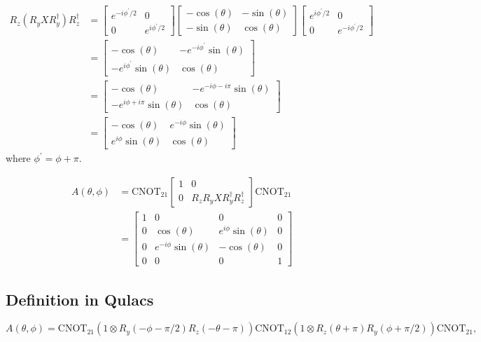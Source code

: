 \documentclass[11pt, oneside]{article}   	%
\begin{document}
\begin{align}
R_z (R_y X R^{\dagger}_y) R^{\dagger}_z
&= 
\begin{bmatrix}
e^{-i \phi^{\prime}/2} & 0 \\
0 & e^{i \phi^{\prime}/2}
\end{bmatrix}
\begin{bmatrix}
- \cos(\theta) & -\sin(\theta) \\
-\sin(\theta) & \cos(\theta)
\end{bmatrix}
\begin{bmatrix}
e^{i \phi^{\prime}/2} & 0 \\
0 & e^{-i \phi^{\prime}/2}
\end{bmatrix} \\
&=
\begin{bmatrix}
- \cos(\theta) & -e^{-i \phi^{\prime}} \sin(\theta) \\
-e^{i \phi^{\prime}} \sin(\theta) & \cos(\theta)
\end{bmatrix} \\
&=
\begin{bmatrix}
- \cos(\theta) & -e^{-i \phi - i \pi} \sin(\theta) \\
-e^{i \phi + i \pi} \sin(\theta) & \cos(\theta)
\end{bmatrix} \\
&=
\begin{bmatrix}
- \cos(\theta) & e^{-i \phi} \sin(\theta) \\
e^{i \phi} \sin(\theta) & \cos(\theta)
\end{bmatrix}
\end{align}
where $\phi^{\prime} = \phi + \pi$.

\begin{align}
A(\theta, \phi) 
&= \mathrm{CNOT}_{21}
\begin{bmatrix}
1 & 0 \\
0 & R_z R_y X R^{\dagger}_y R^{\dagger}_z
\end{bmatrix}
\mathrm{CNOT}_{21} \\
&=
\begin{bmatrix}
1 & 0 & 0 & 0 \\
0 & \cos(\theta) & e^{i \phi} \sin(\theta) & 0 \\
0 & e^{-i \phi} \sin(\theta) & -\cos(\theta) & 0 \\
0 & 0 & 0 & 1
\end{bmatrix}
\end{align}

\subsection{Definition in Qulacs}
\begin{equation}
A(\theta, \phi) = \mathrm{CNOT}_{21} \left(1 \otimes R_y(-\phi - \pi/2) R_z(-\theta - \pi) \right) \mathrm{CNOT}_{12} \left(1 \otimes R_z(\theta + \pi) R_y(\phi + \pi/2) \right) \mathrm{CNOT}_{21},
\end{equation}
\end{document}

